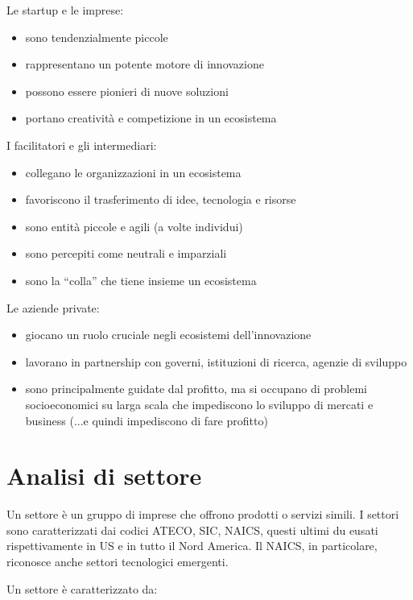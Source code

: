 \documentclass[answers, a4paper, 11pt]{exam}
\begin{document}
Le startup e le imprese:

\begin{itemize}
    \item sono tendenzialmente piccole
    \item rappresentano un potente motore di innovazione
    \item possono essere pionieri di nuove soluzioni
    \item portano creatività e competizione in un ecosistema
\end{itemize}

I facilitatori e gli intermediari:

\begin{itemize}
    \item collegano le organizzazioni in un ecosistema
    \item favoriscono il trasferimento di idee, tecnologia e risorse
    \item sono entità piccole e agili (a volte individui)
    \item sono percepiti come neutrali e imparziali
    \item sono la ``colla'' che tiene insieme un ecosistema
\end{itemize}

Le aziende private:

\begin{itemize}
    \item giocano un ruolo cruciale negli ecosistemi dell'innovazione
    \item lavorano in partnership con governi, istituzioni di ricerca, agenzie di sviluppo
    \item sono principalmente guidate dal profitto, ma si occupano di problemi socioeconomici su larga scala che impediscono lo sviluppo di mercati e business (...e quindi impediscono di fare profitto)
\end{itemize}

\section{Analisi di settore}

Un settore è un gruppo di imprese che offrono prodotti o servizi simili.
I settori sono caratterizzati dai codici ATECO, SIC, NAICS, questi ultimi du eusati rispettivamente in US e in tutto il Nord America. Il NAICS, in particolare, riconosce anche settori tecnologici emergenti.

Un settore è caratterizzato da:
\end{document}
